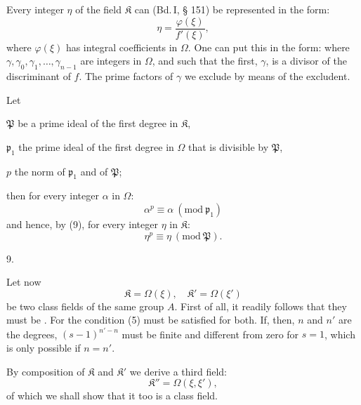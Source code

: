Every integer $\eta$ of the field $\mathfrak{K}$ can (Bd.\,I, § 151) be represented in
the form:
\[
\eta = \frac{\varphi(\xi)}{f'(\xi)},
\]
where $\varphi(\xi)$ has integral coefficients in $\Omega$. One can put this in the
form:
where $\gamma, \gamma_0, \gamma_1, \ldots, \gamma_{n-1}$ are integers in $\Omega$, and such that the
first, $\gamma$, is a divisor of the discriminant of $f$. The prime factors of
$\gamma$ we exclude by means of the excludent.

Let

$\mathfrak{P}$ be a prime ideal of the first degree in $\mathfrak{K}$,

$\mathfrak{p}_1$ the prime ideal of the first degree in $\Omega$ that is divisible by $\mathfrak{P}$,

$p$ the norm of $\mathfrak{p}_1$ and of $\mathfrak{P}$;

then for every integer $\alpha$ in $\Omega$:
\[
\alpha^p \equiv \alpha \ (\mathrm{mod}\ \mathfrak{p}_1)
\]
and
hence, by (9), for every integer $\eta$ in $\mathfrak{K}$:
\[
\eta^p \equiv \eta \ (\mathrm{mod}\ \mathfrak{P}).
\]

9. 

Let now
\[
\mathfrak{K} = \Omega(\xi), \quad \mathfrak{K}' = \Omega(\xi')
\]
be two class fields of the same group $A$. First of all, it readily follows that they must be . For the condition (5) must be satisfied for both. If, then, $n$ and $n'$ are the degrees, $(s-1)^{n'-n}$ must be finite and different from zero for $s=1$, which is only possible if $n=n'$.

By composition of $\mathfrak{K}$ and $\mathfrak{K}'$ we derive a third field:
\[
\mathfrak{K}'' = \Omega(\xi, \xi'),
\]
of which we shall show that it too is a class field.
